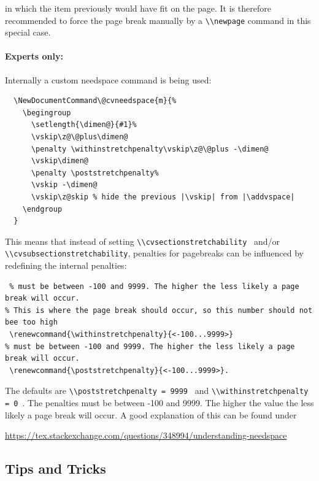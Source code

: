 \documentclass[a4paper,11pt]{article}
\newcommand{\code}[1]{\lstinline!#1!}
\newcommand{\Code}[1]{\lstinline!#1!~} %
\begin{document}
in which the item previously would have fit on the page.
It is therefore recommended to force the page break manually by a \code{\\newpage} command in this special case.

\paragraph{Experts only:}
Internally a custom needspace command is being used:

\begin{lstlisting}
  \NewDocumentCommand\@cvneedspace{m}{%
    \begingroup
      \setlength{\dimen@}{#1}%
      \vskip\z@\@plus\dimen@
      \penalty \withinstretchpenalty\vskip\z@\@plus -\dimen@
      \vskip\dimen@
      \penalty \poststretchpenalty%
      \vskip -\dimen@
      \vskip\z@skip % hide the previous |\vskip| from |\addvspace|
    \endgroup
  }
\end{lstlisting}
This means that instead of setting \Code{\\cvsectionstretchability} and/or \\\code{\\cvsubsectionstretchability}, penalties for pagebreaks can be influenced by redefining the internal penalties:
\begin{lstlisting}
 % must be between -100 and 9999. The higher the less likely a page break will occur.
% This is where the page break should occur, so this number should not bee too high
 \renewcommand{\withinstretchpenalty}{<-100...9999>}
% must be between -100 and 9999. The higher the less likely a page break will occur.
 \renewcommand{\poststretchpenalty}{<-100...9999>}.
\end{lstlisting}
The defaults are \Code{\\poststretchpenalty = 9999} and \Code{\\withinstretchpenalty = 0}.
The penalties must be between -100 and 9999. The higher the value the less likely a page break will occur. A good explanation of this can be found under
\begin{center}
  \url{https://tex.stackexchange.com/questions/348994/understanding-needspace}
\end{center}



\subsection{Tips and Tricks}
\end{document}

